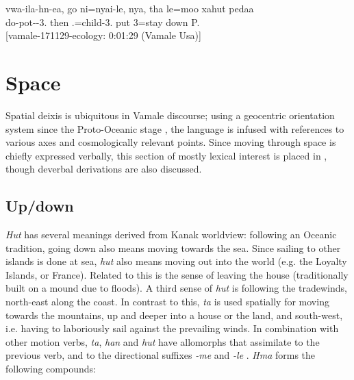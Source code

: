 \ea \label{ex:BenefN3}  \gll vwa-ila-hn-ea, go ni=nyai-le, nya, tha le=moo xahut pedaa\\
 do-pot--3. then .=child-3. put  3=stay down  P.\\
\glt {} {[vamale-171129-ecology: 0:01:29 (Vamale Usa)]} 
\z


\section{Space} 
\label{sec:VSpace} 

Spatial deixis is ubiquitous in Vamale discourse; using a geocentric orientation system since the Proto-Oceanic stage \parencite{francois_reconstructing_2004}, the language is infused with references to various axes and cosmologically relevant points. Since moving through space is chiefly expressed verbally, this section of mostly lexical interest is placed in , though deverbal derivations are also discussed. %


\subsection{Up/down} 
\label{sec:up-down}
\textit{Hut}  has several meanings derived from Kanak worldview: following an Oceanic tradition, going down also means moving towards the sea. Since sailing to other islands is done at sea, \textit{hut} also means moving out into the world (e.g. the Loyalty Islands, or France). Related to this is the sense of leaving the house (traditionally built on a mound due to floods). A third sense of \textit{hut} is following the tradewinds, north-east along the coast. In contrast to this, \textit{ta}  is used spatially for moving towards the mountains, up and deeper into a house or the land, and south-west, i.e. having to laboriously sail against the prevailing winds. In combination with other motion verbs, \textit{ta}, \textit{han}  and \textit{hut} have allomorphs that assimilate to the previous verb, and to the directional suffixes \textit{-me}  and \textit{-le} . \textit{Hma}  forms the following compounds: 

